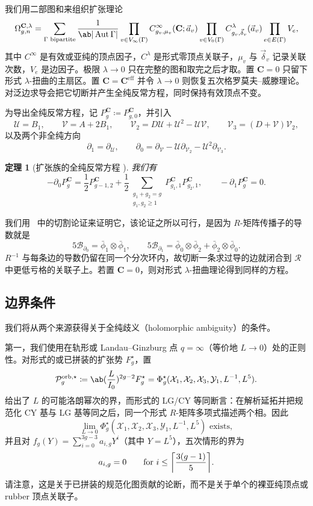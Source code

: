 \documentclass{amsart}
\newtheorem{thm}{定理}[section]
\theoremstyle{definition}
\theoremstyle{remark}
\theoremstyle{plain}
\theoremstyle{definition}
\theoremstyle{remark}
\DeclarePairedDelimiter{\ceil}{\lceil}{\rceil}
\newcommand{\g}{\mathfrak{g}}
\newcommand{\mc}[1]{\mathcal{#1}}
\newcommand{\mbf}[1]{\mathbf{#1}}
\newcommand{\mr}[1]{\mathrm{#1}}
\newcommand{\1}{\mathbf{1}}
\newcommand{\2}{\mathbf{2}}
\newcommand{\3}{\mathbf{3}}
\DeclareMathOperator{\Aut}{Aut}
\begin{document}
我们用二部图和来组织扩张理论
\[ \Omega^{\mbf{C},\lambda}_{g,n} = \sum_{\Gamma \text{ bipartite}} \frac{1}{\ab|\Aut\Gamma|}\prod_{v\in V_{\infty}(\Gamma)} C^{\infty}_{g_v,\mu_v}(\mbf{C};\vec{a}_v) \prod_{v \in V_0(\Gamma)}C^{\lambda}_{g_v,\vec{\delta}_v}(\vec{a}_v)\prod_{e \in E(\Gamma)}V_e, \]
其中 \(C^{\infty}\) 是有效或亚纯的顶点因子，\(C^{\lambda}\) 是形式零顶点关联子，\(\mu_v\) 与 \(\vec{\delta}_v\) 记录关联次数，\(V_e\) 是边因子。极限 \(\lambda \to 0\) 只在完整的图和取完之后才取。置 \(\mbf{C}=0\) 只留下形式 \(\lambda\)-扭曲的主扇区。置 \(\mbf{C}=\mbf{C}^{\mr{eff}}\) 并令 \(\lambda\to0\) 则恢复五次格罗莫夫–威滕理论。对泛边求导会把它切断并产生全纯反常方程，同时保持有效顶点不变。

为导出全纯反常方程，记 \(P^{\mbf{C}}_g \coloneqq P^{\mbf{C}}_{g,0}\)，并引入
\[ \mc{U} = B_1, \qquad \mc{V} = A + 2B_1, \qquad \mc{V}_2 = D\mc{U} + \mc{U}^2 - \mc{U}\mc{V}, \qquad \mc{V}_3 = (D+\mc{V})\mc{V}_2, \]
以及两个非全纯方向
\[ \partial_1 = \partial_{\mc{U}}, \qquad \partial_0 = \partial_{\mc{V}} - \mc{U}\partial_{\mc{V}_2} - \mc{U}^2\partial_{\mc{V}_3}. \]

\begin{thm}[扩张族的全纯反常方程 {\cite{GJRstructure}}]
    我们有
    \[ -\partial_0 P^{\mbf{C}}_g = \frac{1}{2}P^{\mbf{C}}_{g-1,2} + \frac{1}{2}\sum_{\substack{g_1+g_2=g\\g_1,g_2\geq1}}P^{\mbf{C}}_{g_1,1}P^{\mbf{C}}_{g_2,1}, \qquad -\partial_1 P^{\mbf{C}}_g = 0. \]
\end{thm}

我们用~ 中的切割论证来证明它，该论证之所以可行，是因为 \(R\)-矩阵传播子的导数就是
\[ 5\mc{B}_{\partial_0} = \bar{\phi}_1 \otimes \bar{\phi}_1, \qquad 5\mc{B}_{\partial_1} = \bar{\phi}_0\otimes\bar{\phi}_2 + \bar{\phi}_2\otimes\bar{\phi}_0. \]
\(R^{-1}\) 与每条边的导数仍留在同一个分次环内，故切断一条求过导的边就闭合到 \(\mc{R}\) 中更低亏格的关联子上。若置 \(\mbf{C}=0\)，则对形式 \(\lambda\)-扭曲理论得到同样的方程。

\subsection{边界条件}%
\label{sub:Boundary conditions}

我们将从两个来源获得关于全纯歧义（holomorphic ambiguity）的条件。

第一，我们使用在轨形或 Landau--Ginzburg 点 \(q = \infty\)（等价地 \(L \to 0\)）处的正则性。对形式的或已拼装的扩张势 \(F_g^{\star}\)，置
\[ \mc{P}_g^{\mr{orb},\star} \coloneqq \ab(\frac{L}{I_0})^{2g-2}F_g^{\star} = \Phi_g^{\star}(\mc{X}_1,\mc{X}_2,\mc{X}_3,\mc{Y}_1,L^{-1},L^5). \]
 给出了 \(L\) 的可能洛朗幂次的界，而形式的 LG/CY 等同断言：在解析延拓并把规范化 CY 基与 LG 基等同之后，同一个形式 \(R\)-矩阵多项式描述两个相。因此
\[ \lim_{L\to0}\Phi_g^{\star}(\mc{X}_1,\mc{X}_2,\mc{X}_3,\mc{Y}_1,L^{-1},L^5) \text{ exists}, \]
并且对 \(f_g(Y) = \sum_{i=0}^{3g-3}a_{i,g}Y^i\)（其中 \(Y = L^5\)），五次情形的界为
\[ a_{i,g} = 0 \qquad \text{for } i \leq \ceil*{\frac{3(g-1)}{5}}. \]
请注意，这是关于已拼装的规范化图贡献的论断，而不是关于单个的裸亚纯顶点或 rubber 顶点关联子。
\end{document}
